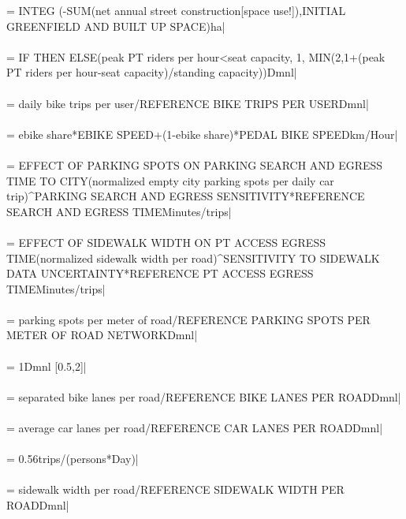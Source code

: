  =  INTEG (-SUM(net annual street construction[space use!]),INITIAL GREENFIELD AND BUILT UP SPACE)ha| \\ \\ 
 = IF THEN ELSE(peak PT riders per hour<seat capacity, 1, MIN(2,1+(peak PT riders per hour-seat capacity)/standing capacity))Dmnl| \\ \\ 
 = daily bike trips per user/REFERENCE BIKE TRIPS PER USERDmnl| \\ \\ 
 = ebike share*EBIKE SPEED+(1-ebike share)*PEDAL BIKE SPEEDkm/Hour| \\ \\ 
 = EFFECT OF PARKING SPOTS ON PARKING SEARCH AND EGRESS TIME TO CITY(normalized empty city parking spots per daily car trip)\^{}PARKING SEARCH AND EGRESS SENSITIVITY*REFERENCE SEARCH AND EGRESS TIMEMinutes/trips| \\ \\ 
 = EFFECT OF SIDEWALK WIDTH ON PT ACCESS EGRESS TIME(normalized sidewalk width per road)\^{}SENSITIVITY TO SIDEWALK DATA UNCERTAINTY*REFERENCE PT ACCESS EGRESS TIMEMinutes/trips| \\ \\ 
 = parking spots per meter of road/REFERENCE PARKING SPOTS PER METER OF ROAD NETWORKDmnl| \\ \\ 
 = 1Dmnl [0.5,2]| \\ \\ 
 = separated bike lanes per road/REFERENCE BIKE LANES PER ROADDmnl| \\ \\ 
 = average car lanes per road/REFERENCE CAR LANES PER ROADDmnl| \\ \\ 
 = 0.56trips/(persons*Day)| \\ \\ 
 = sidewalk width per road/REFERENCE SIDEWALK WIDTH PER ROADDmnl| \\ \\ 
